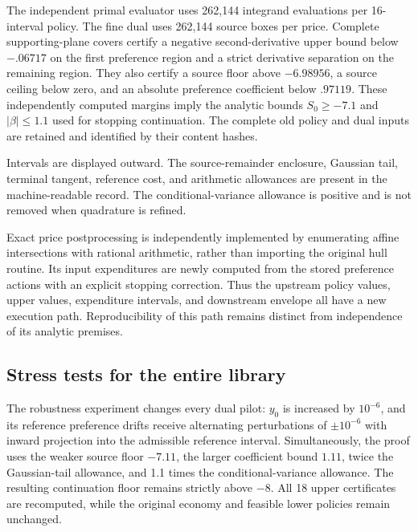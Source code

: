 The independent primal evaluator uses 262,144 integrand evaluations per 16-interval policy. The fine dual uses 262,144 source boxes per price. Complete supporting-plane covers certify a negative second-derivative upper bound below $-.06717$ on the first preference region and a strict derivative separation on the remaining region. They also certify a source floor above $-6.98956$, a source ceiling below zero, and an absolute preference coefficient below $.97119$. These independently computed margins imply the analytic bounds $S_0\geq-7.1$ and $|\beta|\leq1.1$ used for stopping continuation. The complete old policy and dual inputs are retained and identified by their content hashes.

\begin{table}[t]\centering\small
\caption{Separate quantities in the independent $k=4.25$ calculation}\label{tab:dualbudget}

\par\smallskip\footnotesize Intervals are displayed outward. The source-remainder enclosure, Gaussian tail, terminal tangent, reference cost, and arithmetic allowances are present in the machine-readable record. The conditional-variance allowance is positive and is not removed when quadrature is refined.
\end{table}

Exact price postprocessing is independently implemented by enumerating affine intersections with rational arithmetic, rather than importing the original hull routine. Its input expenditures are newly computed from the stored preference actions with an explicit stopping correction. Thus the upstream policy values, upper values, expenditure intervals, and downstream envelope all have a new execution path. Reproducibility of this path remains distinct from independence of its analytic premises.

\subsection{Stress tests for the entire library}
The robustness experiment changes every dual pilot: $y_0$ is increased by $10^{-6}$, and its reference preference drifts receive alternating perturbations of $\pm10^{-6}$ with inward projection into the admissible reference interval. Simultaneously, the proof uses the weaker source floor $-7.11$, the larger coefficient bound $1.11$, twice the Gaussian-tail allowance, and 1.1 times the conditional-variance allowance. The resulting continuation floor remains strictly above $-8$. All 18 upper certificates are recomputed, while the original economy and feasible lower policies remain unchanged.

